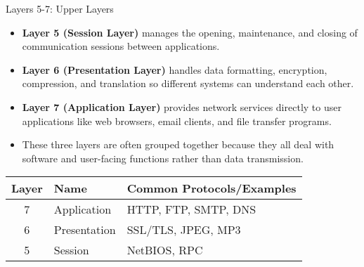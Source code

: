 \documentclass[aspectratio=169]{beamer}
\begin{document}
\begin{frame}{Layers 5-7: Upper Layers}

\begin{itemize}
    \item \textbf{Layer 5 (Session Layer)} manages the opening, maintenance, and closing of communication sessions between applications.
    \item \textbf{Layer 6 (Presentation Layer)} handles data formatting, encryption, compression, and translation so different systems can understand each other.
    \item \textbf{Layer 7 (Application Layer)} provides network services directly to user applications like web browsers, email clients, and file transfer programs.
    \item These three layers are often grouped together because they all deal with software and user-facing functions rather than data transmission.
\end{itemize}

\vspace{0.2cm}

\begin{table}
\centering
\small
\begin{tabular}{|c|l|l|}
\hline
\rowcolor{networkblue!30}
\textbf{Layer} & \textbf{Name} & \textbf{Common Protocols/Examples} \\ \hline
7 & Application & HTTP, FTP, SMTP, DNS \\ \hline
\rowcolor{gray!10}
6 & Presentation & SSL/TLS, JPEG, MP3 \\ \hline
5 & Session & NetBIOS, RPC \\ \hline
\end{tabular}
\end{table}

\end{frame}
\end{document}
